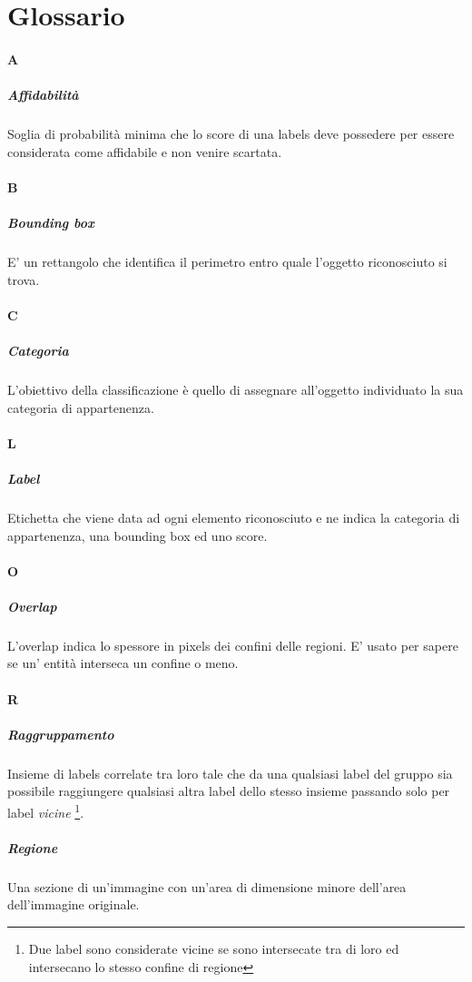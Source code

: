 \section{Glossario}

\paragraph{A}
\subparagraph{Affidabilità}
Soglia di probabilità minima che lo score di una labels deve possedere per essere considerata come affidabile e non venire scartata.

\paragraph{B}
\subparagraph{Bounding box}
E' un rettangolo che identifica il perimetro entro quale l'oggetto riconosciuto si trova.

\paragraph{C}
\subparagraph{Categoria}
L'obiettivo della classificazione è quello di assegnare all'oggetto individuato la sua categoria di appartenenza.

\paragraph{L}
\subparagraph{Label}
Etichetta che viene data ad ogni elemento riconosciuto e ne indica la categoria di appartenenza, una bounding box ed uno score.

\paragraph{O}
\subparagraph{Overlap} L'overlap indica lo spessore in pixels dei confini delle regioni. E' usato per sapere se un' entità interseca un confine o meno.

\paragraph{R}
\subparagraph{Raggruppamento}
Insieme di labels correlate tra loro tale che da una qualsiasi label del gruppo sia possibile raggiungere qualsiasi altra label dello stesso insieme passando solo per label \textit{vicine} \footnote{Due label sono considerate vicine se sono intersecate tra di loro ed intersecano lo stesso confine di regione}.
\subparagraph{Regione} Una sezione di un'immagine con un'area di dimensione minore dell'area dell'immagine originale.

